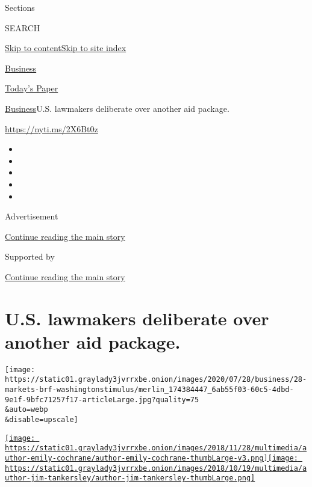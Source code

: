 Sections

SEARCH

\protect\hyperlink{site-content}{Skip to
content}\protect\hyperlink{site-index}{Skip to site index}

\href{https://www.nytimes3xbfgragh.onion/section/business}{Business}

\href{https://myaccount.nytimes3xbfgragh.onion/auth/login?response_type=cookie\&client_id=vi}{}

\href{https://www.nytimes3xbfgragh.onion/section/todayspaper}{Today's
Paper}

\href{/section/business}{Business}\textbar{}U.S. lawmakers deliberate
over another aid package.

\url{https://nyti.ms/2X6Bt0z}

\begin{itemize}
\item
\item
\item
\item
\item
\end{itemize}

Advertisement

\protect\hyperlink{after-top}{Continue reading the main story}

Supported by

\protect\hyperlink{after-sponsor}{Continue reading the main story}

\hypertarget{us-lawmakers-deliberate-over-another-aid-package}{%
\section{U.S. lawmakers deliberate over another aid
package.}\label{us-lawmakers-deliberate-over-another-aid-package}}

\texttt{[image: https://static01.graylady3jvrrxbe.onion/images/2020/07/28/business/28-markets-brf-washingtonstimulus/merlin\_174384447\_6ab55f03-60c5-4dbd-9e1f-9bfc71257f17-articleLarge.jpg?quality=75\\\&auto=webp\\\&disable=upscale]}

\href{https://www.nytimes3xbfgragh.onion/by/emily-cochrane}{\texttt{[image: https://static01.graylady3jvrrxbe.onion/images/2018/11/28/multimedia/author-emily-cochrane/author-emily-cochrane-thumbLarge-v3.png]}}\href{https://www.nytimes3xbfgragh.onion/by/jim-tankersley}{\texttt{[image: https://static01.graylady3jvrrxbe.onion/images/2018/10/19/multimedia/author-jim-tankersley/author-jim-tankersley-thumbLarge.png]}}

